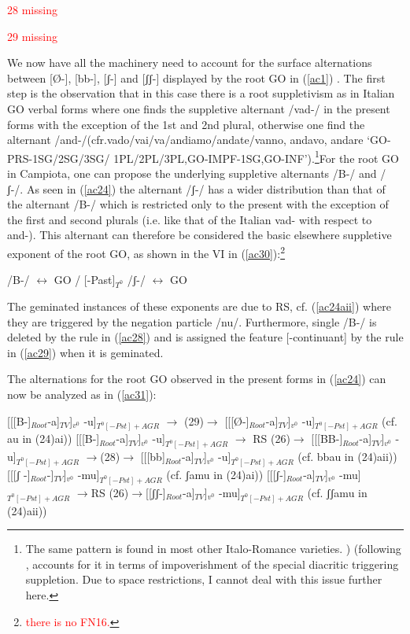 \documentclass[output=paper]{langscibook}
\begin{document}
\ea \label{ac28}\textcolor{red}{28 missing}
\z

\ea \textcolor{red}{29 missing}
\z

We now have all the machinery need to account for the surface alternations between [Ø-], [bb-], [ʃ-]  and [ʃʃ-]  displayed by the root GO in (\ref{ac1}) . The first step is the observation that in this case there is a root suppletivism as in Italian GO verbal forms where one finds the suppletive alternant /vad-/ in the present forms with the exception of the 1st and 2nd plural, otherwise one find the alternant /and-/(cfr.vado/vai/va/andiamo/andate/vanno,  andavo,  andare ‘GO-PRS-1SG/2SG/3SG/ 1PL/2PL/3PL,GO-IMPF-1SG,GO-INF’).\footnote{
The same pattern is found in most other Italo-Romance varieties. \cite{calabrese2012a, calabrese2015a}) (following \cite{embick2010a}, accounts for it in terms of impoverishment of the special diacritic triggering suppletion. Due to space restrictions, I cannot deal with this issue further here.}For the root GO in Campiota, one can propose the underlying suppletive alternants  /B-/  and  /  ʃ-/. As seen in  (\ref{ac24})  the alternant  /ʃ-/  has a wider distribution than that of the alternant  /B-/ which is restricted only to the present with the exception of the first and second plurals (i.e. like that of the Italian  vad- with respect to  and-).  This alternant can therefore be considered the basic elsewhere suppletive exponent of the root GO, as shown in the VI in (\ref{ac30}):\footnote{\textcolor{red}{there is no FN16.}}

\ea\label{ac30}
    \ea \label{ac30a}/B-/ $\longleftrightarrow$ GO / \underline{\hspace{2em}}  [-Past]$_{T^0}$
    \ex\label{ac30b} /ʃ-/ $\longleftrightarrow$ GO
    \z
\z

The geminated instances of these exponents are due to RS, cf. (\ref{ac24aii}) where they are triggered by the negation particle /nu/. Furthermore, single /B-/ is deleted by the rule in (\ref{ac28}) and is assigned the feature [-continuant] by the rule in (\ref{ac29}) when it is geminated.

The alternations for the root GO observed in the present forms in (\ref{ac24}) can now be analyzed as in (\ref{ac31}):

\ea\label{ac31}
    \ea \label{ac31a}{[[[B-]}$_{Root}$-a]$_{TV}$]$_{v^0}$ -u]$_{T^0 [-Pst]+AGR}$ $\rightarrow$ (29)$\rightarrow$ [[[Ø-]$_{Root}$-a]$_{TV}$]$_{v^0}$ -u]$_{T^0 [-Pst]+AGR}$        (cf. au in (24)ai))
    \ex \label{ac31b}{[[[B-]}$_{Root}$-a]$_{TV}$]$_{v^0}$ -u]$_{T^0 [-Pst]+AGR}$ $\rightarrow$ RS (26)$\rightarrow$ [[[BB-]$_{Root}$-a]$_{TV}$]$_{v^0}$ -u]$_{T^0 [-Pst]+AGR}$      $\rightarrow$(28)$\rightarrow$ [[[bb]$_{Root}$-a]$_{TV}$]$_{v^0}$ -u]$_{T^0 [-Pst]+AGR}$   (cf. bbau in (24)aii)) 
    \ex \label{ac31c}{[[[ʃ -]}$_{Root}$-]$_{TV}$]$_{v^0}$ -mu]$_{T^0 [-Pst]+AGR}$ (cf. ʃamu in (24)ai))
    \ex \label{ac31d}{[[[ʃ-]}$_{Root}$-a]$_{TV}$]$_{v^0}$ -mu]$_{T^0 [-Pst]+AGR}$ $\rightarrow$RS (26)$\rightarrow$[[ʃʃ-]$_{Root}$-a]$_{TV}$]$_{v^0}$ -mu]$_{T^0 [-Pst]+AGR}$           (cf. ʃʃamu in (24)aii))
    \z
\z
\end{document}

